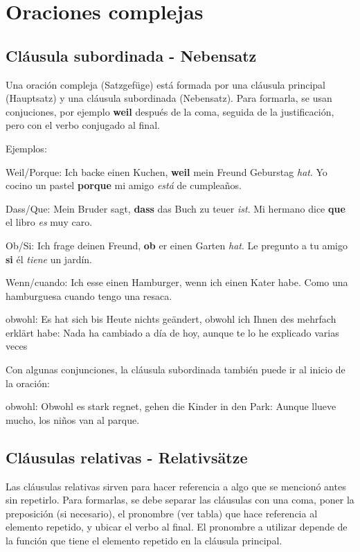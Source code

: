 \section{Oraciones complejas}
\subsection{Cláusula subordinada - Nebensatz}
Una oración compleja (Satzgefüge) está formada por una cláusula principal (Hauptsatz) y una cláusula subordinada (Nebensatz). Para formarla, se usan conjuciones, por ejemplo \textbf{weil} después de la coma, seguida de la justificación, pero con el verbo conjugado al final.

Ejemplos: 
\begin{myitemize}
\item Weil/Porque: Ich backe einen Kuchen, \textbf{weil} mein Freund Geburstag \textit{hat}. Yo cocino un pastel \textbf{porque} mi amigo \textit{está} de cumpleaños.
\item Dass/Que: Mein Bruder sagt, \textbf{dass} das Buch zu teuer \textit{ist}. Mi hermano dice \textbf{que} el libro \textit{es} muy caro.
\item Ob/Si: Ich frage deinen Freund, \textbf{ob} er einen Garten \textit{hat}. Le pregunto a tu amigo \textbf{si} él \textit{tiene} un jardín.
\item Wenn/cuando: Ich esse einen Hamburger, wenn ich einen Kater habe. Como una hamburguesa cuando tengo una resaca.
\item obwohl: Es hat sich bis Heute nichts geändert, obwohl ich Ihnen des mehrfach erklärt habe: Nada ha cambiado a día de hoy, aunque te lo he explicado varias veces 
\end{myitemize}

Con algunas conjunciones, la cláusula subordinada también puede ir al inicio de la oración:
\begin{myitemize}
\item obwohl: Obwohl es stark regnet, gehen die Kinder in den Park: Aunque llueve mucho, los niños van al parque.
\end{myitemize}

\subsection{Cláusulas relativas - Relativsätze}
Las cláusulas relativas sirven para hacer referencia a algo que se mencionó antes sin repetirlo. Para formarlas, se debe separar las cláusulas con una coma, poner la preposición (si necesario), el pronombre (ver tabla) que hace referencia al elemento repetido, y ubicar el verbo al final. El pronombre a utilizar depende de la función que tiene el elemento repetido en la cláusula principal.

